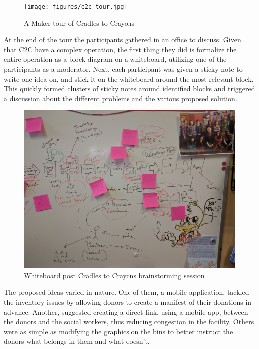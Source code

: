   \begin{figure}[thpb]
      \centering
      \texttt{[image: figures/c2c-tour.jpg]}
      \caption{A Maker tour of Cradles to Crayons}
      \label{fig_setc_class}
   \end{figure}

At the end of the tour the participants gathered in an office to discuss. Given that C2C have a complex operation, the first thing they did is formalize the entire operation as a block diagram on a whiteboard, utilizing one of the participants as a moderator. Next, each participant was given a sticky note to write one idea on, and stick it on the whiteboard around the most relevant block. This quickly formed clusters of sticky notes around identified blocks and triggered a discussion about the different problems and the various proposed solution. 

   \begin{figure}[thpb]
      \centering
      \includegraphics[width=\textwidth]{figures/c2c-brainstorming.jpg}
      \caption{Whiteboard post Cradles to Crayons brainstorming session}
      \label{fig_setc_class}
   \end{figure}


The proposed ideas varied in nature. One of them, a mobile application, tackled the inventory issues by allowing donors to create a manifest of their donations in advance. Another, suggested creating a direct link, using a mobile app, between the donors and the social workers, thus reducing congestion in the facility. Others were as simple as modifying the graphics on the bins to better instruct the donors what belongs in them and what doesn't. 

